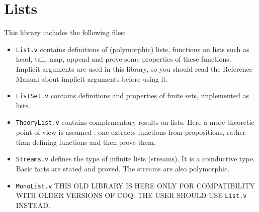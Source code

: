 \section{Lists}\label{Lists}

This library includes the following files:

\begin{itemize}

\item {\tt List.v} contains definitions of (polymorphic) lists, 
  functions on lists such as head, tail, map, append and prove some
  properties of these functions. Implicit arguments are used in this
  library, so you should read the Reference Manual about implicit
  arguments before using it.

\item {\tt ListSet.v} contains definitions and properties of finite
  sets, implemented as lists.

\item {\tt TheoryList.v} contains complementary results on lists. Here
  a more theoretic point of view is assumed : one extracts functions
  from propositions, rather than defining functions and then prove them.

\item {\tt Streams.v} defines the type of infinite lists (streams). It is a
  coinductive type. Basic facts are stated and proved. The streams are
  also polymorphic.

\item {\tt MonoList.v} THIS OLD LIBRARY IS HERE ONLY FOR COMPATIBILITY
  WITH OLDER VERSIONS OF COQ. THE USER SHOULD USE {\tt List.v} INSTEAD.

\end{itemize}
